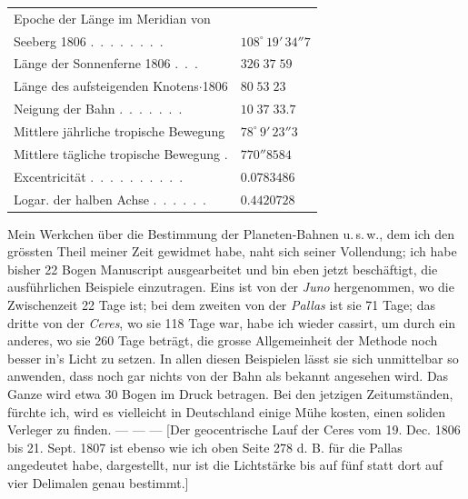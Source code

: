 \begin{center}\begingroup
\fontsize{9}{11}\selectfont
\setlength{\tabcolsep}{3pt}\renewcommand{\arraystretch}{1.12}
\begin{tabular}{ll}
\multicolumn{2}{l}{Epoche der Länge im Meridian von} \\
\quad Seeberg 1806 .\ .\ .\ .\ .\ .\ .\ . & $108^\circ\,19'\,34''7$ \\
Länge der Sonnenferne 1806 .\ .\ . & $326\;37\;59$ \\
Länge des aufsteigenden Knotens$\cdot$1806  & $80\;53\;23$ \\
Neigung der Bahn .\ .\ .\ .\ .\ .\ . & $10\;37\;33.7$ \\
Mittlere jährliche tropische Bewegung  & $78^\circ\,9'\,23''3$ \\
Mittlere tägliche tropische Bewegung . & $770''8584$ \\
Excentricität .\ .\ .\ .\ .\ .\ .\ .\ .\ . & $0.0783486$ \\
Logar. der halben Achse .\ .\ .\ .\ .\ . & $0.4420728$ \\
\end{tabular}\endgroup\end{center}

\par\indent Mein Werkchen über die Bestimmung der Planeten-Bahnen u.\,s.\,w., dem ich den grössten Theil
meiner Zeit gewidmet habe, naht sich seiner Vollendung; ich habe bisher 22 Bogen Manuscript
ausgearbeitet und bin eben jetzt beschäftigt, die ausführlichen Beispiele einzutragen. Eins ist von
der \emph{Juno} hergenommen, wo die Zwischenzeit 22 Tage ist; bei dem zweiten von der \emph{Pallas} ist
sie 71 Tage; das dritte von der \emph{Ceres}, wo sie 118 Tage war, habe ich wieder cassirt, um durch ein
anderes, wo sie 260 Tage beträgt, die grosse Allgemeinheit der Methode noch besser in's Licht zu
setzen. In allen diesen Beispielen lässt sie sich unmittelbar so anwenden, dass noch gar nichts von
der Bahn als bekannt angesehen wird. Das Ganze wird etwa 30 Bogen im Druck betragen. Bei den
jetzigen Zeitumständen, fürchte ich, wird es vielleicht in Deutschland einige Mühe kosten, einen
soliden Verleger zu finden. --- --- --- [Der geocentrische Lauf der Ceres vom 19. Dec. 1806 bis
21. Sept. 1807 ist ebenso wie ich oben Seite 278 d. B. für die Pallas angedeutet habe, dargestellt,
nur ist die Lichtstärke bis auf fünf statt dort auf vier Delimalen genau bestimmt.]
